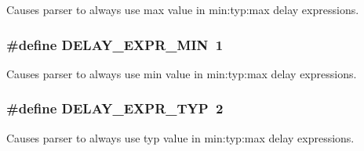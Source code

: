 Causes parser to always use max value in min:typ:max delay expressions. 
\subsubsection{\setlength{\rightskip}{0pt plus 5cm}\#define DELAY\_\-EXPR\_\-MIN\ 1}\label{group__delay__expr__types_a1}


Causes parser to always use min value in min:typ:max delay expressions. 
\subsubsection{\setlength{\rightskip}{0pt plus 5cm}\#define DELAY\_\-EXPR\_\-TYP\ 2}\label{group__delay__expr__types_a2}


Causes parser to always use typ value in min:typ:max delay expressions. 